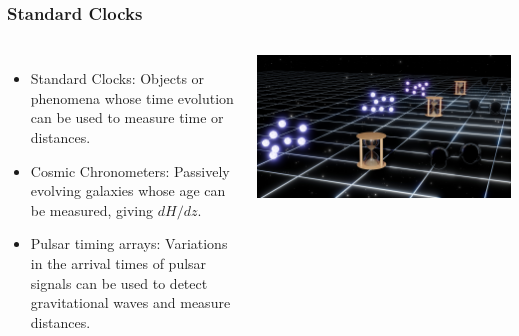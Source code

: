 \documentclass[aspectratio=169]{beamer}
\begin{document}
\begin{frame}
    \frametitle{Standard Clocks}
    \begin{columns}
        \begin{itemize}
            \item Standard Clocks: Objects or phenomena whose time evolution can be used to measure time or distances.
            \item Cosmic Chronometers: Passively evolving galaxies whose age can be measured, giving $dH/dz$. \hfill {}
            \item Pulsar timing arrays: Variations in the arrival times of pulsar signals can be used to detect gravitational waves and measure distances.
        \end{itemize}
        \includegraphics[width=\textwidth]{figures/timers.jpg}
    \end{columns}
\end{frame}
 
\end{document}
